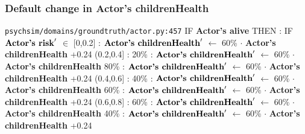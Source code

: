 \documentclass{article}%
\begin{document}
\subsubsection{Default change in Actor's childrenHealth}%
\label{ssubsec:Default change in Actor's childrenHealth}%
\begin{flushleft}%
\verb|psychsim/domains/groundtruth/actor.py:457|%
\linebreak%
IF %
\textbf{Actor's alive}%
\linebreak%
\hspace*{2em}%
THEN %
: %
IF %
$\mbox{\textbf{Actor's risk}} '$%
$\in$%
\linebreak%
\hspace*{4em}%
{[}0,0.2{]}%
: %
$\mbox{\textbf{Actor's childrenHealth}} '$%
$\leftarrow$%
60\%%
$\cdot$%
\textbf{Actor's childrenHealth}%
+0.24%
\linebreak%
\hspace*{4em}%
(0.2,0.4{]}%
: %
\linebreak%
\hspace*{6em}%
20\%%
: %
$\mbox{\textbf{Actor's childrenHealth}} '$%
$\leftarrow$%
60\%%
$\cdot$%
\textbf{Actor's childrenHealth}%
\linebreak%
\hspace*{6em}%
80\%%
: %
$\mbox{\textbf{Actor's childrenHealth}} '$%
$\leftarrow$%
60\%%
$\cdot$%
\textbf{Actor's childrenHealth}%
+0.24%
\linebreak%
\hspace*{4em}%
(0.4,0.6{]}%
: %
\linebreak%
\hspace*{6em}%
40\%%
: %
$\mbox{\textbf{Actor's childrenHealth}} '$%
$\leftarrow$%
60\%%
$\cdot$%
\textbf{Actor's childrenHealth}%
\linebreak%
\hspace*{6em}%
60\%%
: %
$\mbox{\textbf{Actor's childrenHealth}} '$%
$\leftarrow$%
60\%%
$\cdot$%
\textbf{Actor's childrenHealth}%
+0.24%
\linebreak%
\hspace*{4em}%
(0.6,0.8{]}%
: %
\linebreak%
\hspace*{6em}%
60\%%
: %
$\mbox{\textbf{Actor's childrenHealth}} '$%
$\leftarrow$%
60\%%
$\cdot$%
\textbf{Actor's childrenHealth}%
\linebreak%
\hspace*{6em}%
40\%%
: %
$\mbox{\textbf{Actor's childrenHealth}} '$%
$\leftarrow$%
60\%%
$\cdot$%
\textbf{Actor's childrenHealth}%
+0.24%
\linebreak%

\end{flushleft}
\end{document}
